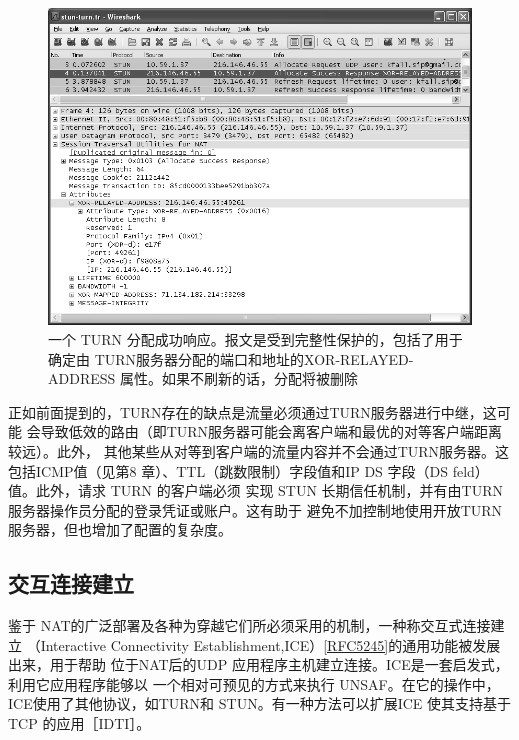 \begin{figure}[H]
    \centering
	\includegraphics[scale=0.5]{imgs/7/7-15.png}
	\caption{一个 TURN 分配成功响应。报文是受到完整性保护的，包括了用于确定由 TURN服务器分配的端口和地址的XOR-RELAYED-ADDRESS 属性。如果不刷新的话，分配将被删除}
\end{figure}

正如前面提到的，TURN存在的缺点是流量必须通过TURN服务器进行中继，这可能
会导致低效的路由（即TURN服务器可能会离客户端和最优的对等客户端距离较远）。此外，
其他某些从对等到客户端的流量内容并不会通过TURN服务器。这包括ICMP值（见第8
章）、TTL（跳数限制）字段值和IP DS 字段（DS feld）值。此外，请求 TURN 的客户端必须
实现 STUN 长期信任机制，并有由TURN服务器操作员分配的登录凭证或账户。这有助于
避免不加控制地使用开放TURN 服务器，但也增加了配置的复杂度。

\subsection{交互连接建立}

鉴于 NAT的广泛部署及各种为穿越它们所必须采用的机制，一种称交互式连接建立
（Interactive Connectivity Establishment,ICE）\href{https://www.rfc-editor.org/rfc/rfc5245}{[RFC5245]}的通用功能被发展出来，用于帮助
位于NAT后的UDP 应用程序主机建立连接。ICE是一套启发式，利用它应用程序能够以
一个相对可预见的方式来执行 UNSAF。在它的操作中，ICE使用了其他协议，如TURN和
STUN。有一种方法可以扩展ICE 使其支持基于TCP 的应用［IDTI］。

